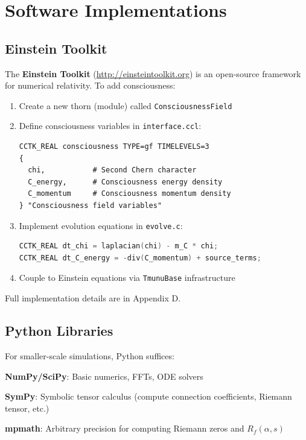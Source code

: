 \section{Software Implementations}

\subsection{Einstein Toolkit}

The \textbf{Einstein Toolkit} (\url{http://einsteintoolkit.org}) is an open-source framework for numerical relativity. To add consciousness:

\begin{enumerate}
\item Create a new thorn (module) called \texttt{ConsciousnessField}
\item Define consciousness variables in \texttt{interface.ccl}:
\begin{lstlisting}
CCTK_REAL consciousness TYPE=gf TIMELEVELS=3
{
  chi,           # Second Chern character
  C_energy,      # Consciousness energy density
  C_momentum     # Consciousness momentum density
} "Consciousness field variables"
\end{lstlisting}

\item Implement evolution equations in \texttt{evolve.c}:
\begin{lstlisting}[language=C]
CCTK_REAL dt_chi = laplacian(chi) - m_C * chi;
CCTK_REAL dt_C_energy = -div(C_momentum) + source_terms;
\end{lstlisting}

\item Couple to Einstein equations via \texttt{TmunuBase} infrastructure
\end{enumerate}

Full implementation details are in Appendix D.

\subsection{Python Libraries}

For smaller-scale simulations, Python suffices:

\textbf{NumPy/SciPy}: Basic numerics, FFTs, ODE solvers

\textbf{SymPy}: Symbolic tensor calculus (compute connection coefficients, Riemann tensor, etc.)

\textbf{mpmath}: Arbitrary precision for computing Riemann zeros and $R_f(\alpha, s)$

